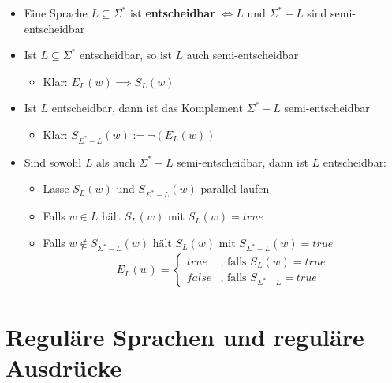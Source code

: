 \documentclass{scrartcl}
\begin{document}
\begin{itemize}
 	\item Eine Sprache $L \subseteq \Sigma^*$ ist \textbf{entscheidbar} $\iff L$ und $\Sigma^* - L$ sind semi-entscheidbar
 	\item Ist $L \subseteq \Sigma^*$ entscheidbar, so ist $L$ auch semi-entscheidbar
 	\begin{itemize}
 		\item Klar: $E_L(w) \implies S_L(w)$
 	\end{itemize}
 	\item Ist $L$ entscheidbar, dann ist das Komplement $\Sigma^* - L$ semi-entscheidbar
 	\begin{itemize}
 		\item Klar: $S_{\Sigma^* - L}(w) := \neg (E_L(w))$
	 \end{itemize}
 	\item Sind sowohl $L$ als auch $\Sigma^* - L$ semi-entscheidbar, dann ist $L$ entscheidbar:
 	\begin{itemize}
 		\item Lasse $S_L(w)$ und $S_{\Sigma^* - L}(w)$ parallel laufen
 		\item Falls $w \in L$ hält $S_L(w)$ mit $S_L(w) = true$
 		\item Falls $w \not \in S_{\Sigma^* - L}(w)$ hält $S_L(w)$ mit $S_{\Sigma^* - L}(w) = true$
 		\begin{align*}
			E_L(w) = \begin{cases}
				true & \text{, falls } S_L(w) = true \\
				false & \text{, falls } S_{\Sigma^* - L} = true
			\end{cases}
		\end{align*}
 	\end{itemize}
\end{itemize}

\pagebreak
\section{Reguläre Sprachen und reguläre Ausdrücke}
\end{document}
